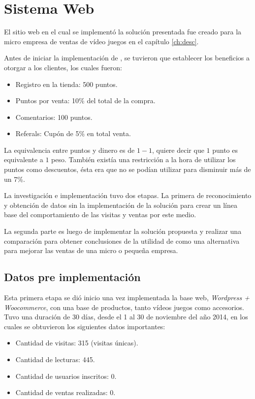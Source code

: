 \section{Sistema Web}
\label{cap_estudio}

El sitio web en el cual se implementó la solución presentada fue creado para la micro empresa de
ventas de vídeo juegos en el capítulo \ref{ch:desc}.

Antes de iniciar la implementación de {\GAM}, se tuvieron que establecer los beneficios a otorgar a los 
clientes, los cuales fueron:

\begin{itemize}

\item Registro en la tienda: 500 puntos.
\item Puntos por venta: 10\% del total de la compra.
\item Comentarios: 100 puntos.
\item Referals: Cupón de 5\% en total venta.

\end{itemize}

La equivalencia entre puntos y dinero es de $1-1$, quiere decir que $1$ punto es equivalente a 
$1$ peso. También existía una restricción a la hora de utilizar los puntos como descuentos, ésta 
era que no se podían utilizar para disminuir más de un 7\%.

La investigación e implementación tuvo dos etapas. La primera de reconocimiento y obtención de datos
 sin la implementación de la solución para crear un línea base del comportamiento de las visitas 
y ventas por este medio.

La segunda parte es luego de implementar la solución
propuesta y realizar una comparación para obtener conclusiones de la utilidad de
{\gam} como una alternativa para mejorar las ventas de una micro o pequeña empresa.

\subsection{Datos pre implementación {\gam}}

Esta primera etapa se dió inicio una vez implementada la base web,
\emph{Wordpress + Woocommerce}, con una base de productos, tanto vídeos juegos como
accesorios.
Tuvo una duración de 30 días, desde el 1 al 30 de noviembre del año 2014,
en los cuales se obtuvieron los siguientes datos importantes:


\begin{itemize}
    \item Cantidad de visitas: 315 (visitas únicas).
    \item Cantidad de lecturas: 445.
    \item Cantidad de usuarios inscritos: 0.
    \item Cantidad de ventas realizadas: 0.
\end{itemize}

